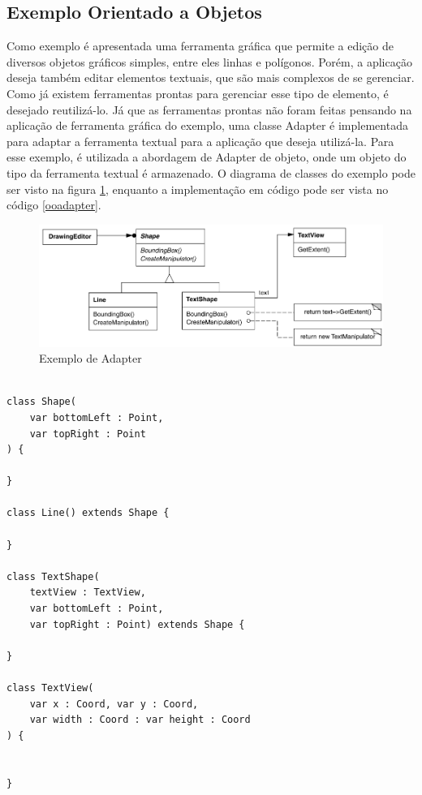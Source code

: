 \subsection*{Exemplo Orientado a Objetos}

Como exemplo é apresentada uma ferramenta gráfica 
que permite a edição de diversos objetos gráficos 
simples, entre eles linhas e polígonos. Porém, 
a aplicação deseja também editar elementos textuais, 
que são mais complexos de se gerenciar. Como já existem 
ferramentas prontas para gerenciar esse tipo de 
elemento, é desejado reutilizá-lo. Já que as 
ferramentas prontas não foram feitas pensando na 
aplicação de ferramenta gráfica do exemplo, uma 
classe Adapter é implementada para adaptar a 
ferramenta textual para a aplicação que deseja 
utilizá-la. Para esse exemplo, é utilizada a 
abordagem de Adapter de objeto, onde um objeto 
do tipo da ferramenta textual é armazenado. O 
diagrama de classes do exemplo pode ser visto na 
figura \ref{adapter_exemplo}, enquanto a 
implementação em código pode ser vista no código 
\ref{ooadapter}.


\begin{figure}[htb]
	\caption{\label{adapter_exemplo}Exemplo de Adapter}
	\begin{center}
	    \includegraphics[scale=0.45]{5_padroes-contexto-funcional/5.2_estruturais/5.2.1_adapter/exemplo_adapter.png}
	\end{center}
\end{figure}


\begin{lstlisting}[caption={Adapter Orientado a Objetos},label=ooadapter]

class Shape(
	var bottomLeft : Point, 
	var topRight : Point
) {

}

class Line() extends Shape {

}

class TextShape(
	textView : TextView,
	var bottomLeft : Point, 
	var topRight : Point) extends Shape {

}

class TextView(
	var x : Coord, var y : Coord,
	var width : Coord : var height : Coord
) {


}


\end{lstlisting}



